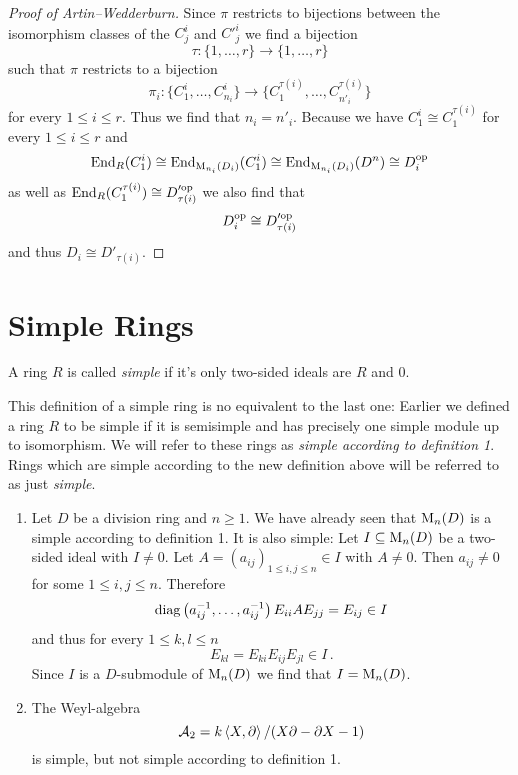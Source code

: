 \begin{proof}[Proof of Artin--Wedderburn]
  Since $\pi$ restricts to bijections between the isomorphism classes of the $C^i_j$ and $C'^i_j$ we find a bijection
  \[
            \tau
    \colon  \{1, \dotsc, r\}
    \to     \{1, \dotsc, r\}
  \]
  such that $\pi$ restricts to a bijection
  \[
            \pi_i
    \colon  \{ C^i_1, \dotsc, C^i_{n_i} \}
    \to     \{ C^{\tau(i)}_1, \dotsc, C^{\tau(i)}_{n'_i} \}
  \]
  for every $1 \leq i \leq r$.
  Thus we find that $n_i = n'_i$.
  Because we have $C^i_1 \cong C^{\tau(i)}_1$ for every $1 \leq i \leq r$ and
  \[
          \operatorname{End}_R(C^i_1)
    \cong \operatorname{End}_{\operatorname{M}_{n_i}(D_i)}(C^i_1)
    \cong \operatorname{End}_{\operatorname{M}_{n_i}(D_i)}(D^n)
    \cong D_i^{\mathrm{op}}
  \]
  as well as $\operatorname{End}_R(C^{\tau(i)}_1) \cong D_{\tau(i)}'^{\mathrm{op}}$ we also find that
  \[
          D_i^{\mathrm{op}}
    \cong D_{\tau(i)}'^{\mathrm{op}}
  \]
  and thus $D_i \cong D'_{\tau(i)}$.
\end{proof}





\section{Simple Rings}


\begin{definition}
  A ring $R$ is called \emph{simple} if it’s only two-sided ideals are $R$ and $0$.
\end{definition}


\begin{warning}
  This definition of a simple ring is no equivalent to the last one:
  Earlier we defined a ring $R$ to be simple if it is semisimple and has precisely one simple module up to isomorphism.
  We will refer to these rings as \emph{simple according to definition 1}.
  Rings which are simple according to the new definition above will be referred to as just \emph{simple}.
\end{warning}


\begin{example}
  \begin{enumerate}[label=\emph{\alph*)},leftmargin=*]
    \item
      Let $D$ be a division ring and $n \geq 1$.
      We have already seen that $\operatorname{M}_n(D)$ is a simple according to definition 1.
      It is also simple:
      Let $I \subseteq \operatorname{M}_n(D)$ be a two-sided ideal with $I \neq 0$.
      Let $A = (a_{ij})_{1 \leq i,j \leq n} \in I$ with $A \neq 0$.
      Then $a_{ij} \neq 0$ for some $1 \leq i,j \leq n$.
      Therefore
      \[
          \operatorname{diag}\left( a_{ij}^{-1}, \dotsc, a_{ij}^{-1} \right) E_{ii} A E_{jj}
        = E_{ij} \in I
      \]
      and thus for every $1 \leq k,l \leq n$
      \[
            E_{kl}
        =   E_{ki} E_{ij} E_{jl}
        \in I \,.
      \]
      Since $I$ is a $D$-submodule of $\operatorname{M}_n(D)$ we find that $I = \operatorname{M}_n(D)$.
    \item
      The Weyl-algebra
      \[
          \mathcal{A}_2
        = k \left\langle X,\partial \right\rangle / (X \partial - \partial X - 1)
      \]
      is simple, but not simple according to definition 1.
  \end{enumerate}
\end{example}



